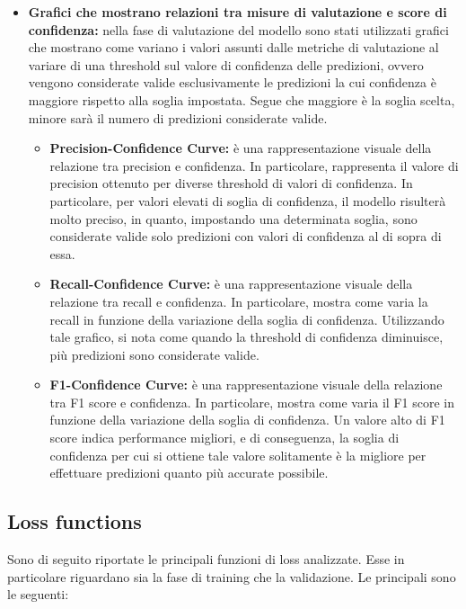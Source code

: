 \documentclass[12pt]{article}
\begin{document}
\begin{itemize}
    \item \textbf{Grafici che mostrano relazioni tra misure di valutazione e score di confidenza:} nella fase di valutazione del modello sono stati utilizzati grafici che mostrano come variano i valori assunti dalle metriche di valutazione al variare di una threshold sul valore di confidenza delle predizioni, ovvero vengono considerate valide esclusivamente le predizioni la cui confidenza è maggiore rispetto alla soglia impostata. Segue che maggiore è la soglia scelta, minore sarà il numero di predizioni considerate valide.
    \begin{itemize}
        \item \textbf{Precision-Confidence Curve:} è una rappresentazione visuale della relazione tra precision e confidenza. In particolare, rappresenta il valore di precision ottenuto per diverse threshold di valori di confidenza. In particolare, per valori elevati di soglia di confidenza, il modello risulterà molto preciso, in quanto, impostando una determinata soglia, sono considerate valide solo predizioni con valori di confidenza al di sopra di essa.
        \item \textbf{Recall-Confidence Curve:} è una rappresentazione visuale della relazione tra recall e confidenza. In particolare, mostra come varia la recall in funzione della variazione della soglia di confidenza. Utilizzando tale grafico, si nota come quando la threshold di confidenza diminuisce, più predizioni sono considerate valide.
        \item \textbf{F1-Confidence Curve:} è una rappresentazione visuale della relazione tra F1 score e confidenza. In particolare, mostra come varia il F1 score in funzione della variazione della soglia di confidenza. Un valore alto di F1 score indica performance migliori, e di conseguenza, la soglia di confidenza per cui si ottiene tale valore solitamente è la migliore per effettuare predizioni quanto più accurate possibile.
    \end{itemize}
\end{itemize}

\subsection{Loss functions}
Sono di seguito riportate le principali funzioni di loss analizzate. Esse in particolare riguardano sia la fase di training che la validazione.
Le principali sono le seguenti:
\end{document}
